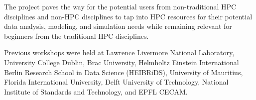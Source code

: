 The project paves the way for the potential users from non-traditional HPC disciplines and non-HPC disciplines to tap into HPC resources for their potential data analysis, modeling, and simulation needs while remaining relevant for beginners from the traditional HPC disciplines.

Previous workshops were held at Lawrence Livermore National Laboratory, University College Dublin, Brac University, Helmholtz Einstein International Berlin Research School in Data Science (HEIBRiDS), University of Mauritius, Florida International University, Delft University of Technology, National Institute of Standards and Technology, and EPFL CECAM.

